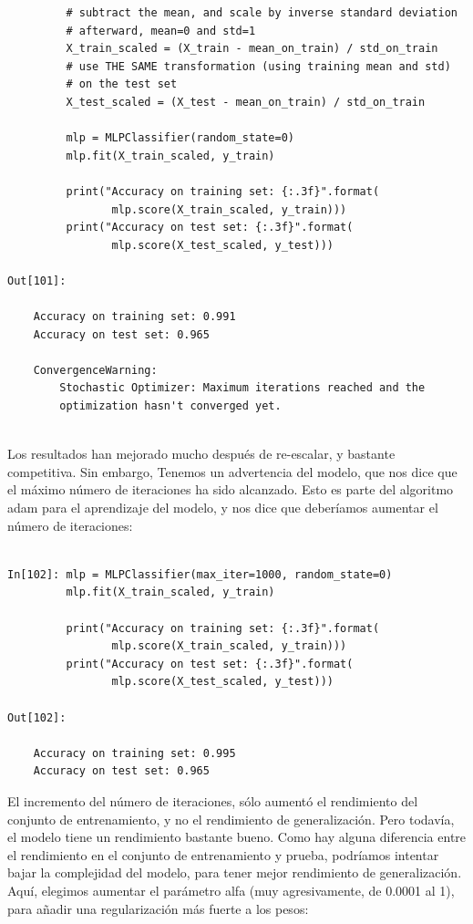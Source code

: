 {\begin{lstlisting}
         # subtract the mean, and scale by inverse standard deviation
         # afterward, mean=0 and std=1
         X_train_scaled = (X_train - mean_on_train) / std_on_train
         # use THE SAME transformation (using training mean and std)
         # on the test set
         X_test_scaled = (X_test - mean_on_train) / std_on_train
   
         mlp = MLPClassifier(random_state=0)
         mlp.fit(X_train_scaled, y_train)
   
         print("Accuracy on training set: {:.3f}".format(
                mlp.score(X_train_scaled, y_train)))
         print("Accuracy on test set: {:.3f}".format(
                mlp.score(X_test_scaled, y_test)))
  
Out[101]:
   
    Accuracy on training set: 0.991
    Accuracy on test set: 0.965

    ConvergenceWarning:
        Stochastic Optimizer: Maximum iterations reached and the
        optimization hasn't converged yet.


\end{lstlisting}

Los resultados han mejorado mucho después de re-escalar, y bastante competitiva. Sin embargo, Tenemos un 
advertencia del modelo, que nos dice que el máximo número de iteraciones ha sido alcanzado. Esto es parte del algoritmo  {\ttfamily adam }  para el aprendizaje del modelo, y nos dice que deberíamos aumentar el número de iteraciones:


\begin{lstlisting}  

In[102]: mlp = MLPClassifier(max_iter=1000, random_state=0)
         mlp.fit(X_train_scaled, y_train)

         print("Accuracy on training set: {:.3f}".format(
                mlp.score(X_train_scaled, y_train)))
         print("Accuracy on test set: {:.3f}".format(
	            mlp.score(X_test_scaled, y_test)))

Out[102]:

    Accuracy on training set: 0.995
    Accuracy on test set: 0.965
\end{lstlisting}


El incremento del número de iteraciones, sólo aumentó el rendimiento del conjunto de entrenamiento, y no
el rendimiento de generalización. Pero todavía, el modelo tiene un rendimiento bastante bueno.  Como hay 
alguna diferencia  entre el rendimiento en el conjunto de  entrenamiento y  prueba, podríamos intentar bajar la complejidad del modelo, para tener mejor rendimiento de generalización. Aquí, elegimos
aumentar el parámetro {\ttfamily alfa} (muy agresivamente, de  0.0001 al 1), para añadir una regularización más fuerte  a los pesos:


}
